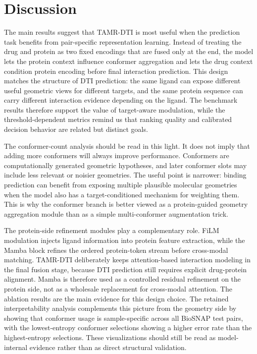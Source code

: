 \section{Discussion}

The main results suggest that TAMR-DTI is most useful when the prediction task benefits from pair-specific
representation learning. Instead of treating the drug and protein as two fixed encodings that are fused only
at the end, the model lets the protein context influence conformer aggregation and lets the drug context
condition protein encoding before final interaction prediction. This design matches the structure of DTI
prediction: the same ligand can expose different useful geometric views for different targets, and the same
protein sequence can carry different interaction evidence depending on the ligand. The benchmark results
therefore support the value of target-aware modulation, while the threshold-dependent metrics remind us that
ranking quality and calibrated decision behavior are related but distinct goals.

The conformer-count analysis should be read in this light. It does not imply that adding more conformers will
always improve performance. Conformers are computationally generated geometric hypotheses, and later
conformer slots may include less relevant or noisier geometries. The useful point is narrower: binding
prediction can benefit from exposing multiple plausible molecular geometries when the model also has a
target-conditioned mechanism for weighting them. This is why the conformer branch is better viewed as a
protein-guided geometry aggregation module than as a simple multi-conformer augmentation trick.

The protein-side refinement modules play a complementary role. FiLM modulation injects ligand information
into protein feature extraction, while the Mamba block refines the ordered protein-token stream before
cross-modal matching. TAMR-DTI deliberately keeps attention-based interaction modeling in the final fusion
stage, because DTI prediction still requires explicit drug-protein alignment. Mamba is therefore used as a
controlled residual refinement on the protein side, not as a wholesale replacement for cross-modal attention.
The ablation results are the main evidence for this design choice. The retained interpretability analysis
complements this picture from the geometry side by showing that conformer usage is sample-specific across all
\InterpNumSamples{} BioSNAP test pairs, with the lowest-entropy conformer selections showing a higher error
rate than the highest-entropy selections. These visualizations should still be read as model-internal evidence
rather than as direct structural validation.


